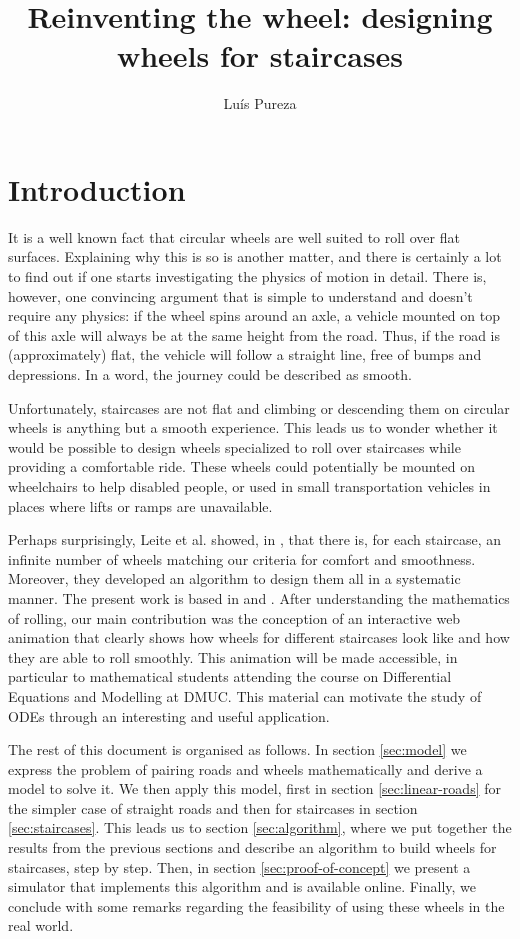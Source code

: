 \documentclass{article}
\theoremstyle{theorem}
\theoremstyle{theorem}
\begin{document}
\title{Reinventing the wheel: designing wheels for staircases} \date{}
\author{ Luís Pureza }
\maketitle

\section{Introduction}

It is a well known fact that circular wheels are well suited to roll
over flat surfaces. Explaining why this is so is another matter, and
there is certainly a lot to find out if one starts investigating the
physics of motion in detail. There is, however, one convincing
argument that is simple to understand and doesn't require any physics:
if the wheel spins around an axle, a vehicle mounted on top of this
axle will always be at the same height from the road. Thus, if the
road is (approximately) flat, the vehicle will follow a straight line,
free of bumps and depressions. In a word, the journey could be
described as smooth.

Unfortunately, staircases are not flat and climbing or descending them
on circular wheels is anything but a smooth experience. This leads us
to wonder whether it would be possible to design wheels specialized to
roll over staircases while providing a comfortable ride. These wheels
could potentially be mounted on wheelchairs to help disabled people,
or used in small transportation vehicles in places where lifts or
ramps are unavailable.

Perhaps surprisingly, Leite et al. showed, in \cite{leite}, that there
is, for each staircase, an infinite number of wheels matching our
criteria for comfort and smoothness. Moreover, they developed an
algorithm to design them all in a systematic manner. The present work
is based in \cite{hall-wagon} and \cite{leite}. After understanding
the mathematics of rolling, our main contribution was the conception
of an interactive web animation that clearly shows how wheels for
different staircases look like and how they are able to roll
smoothly. This animation will be made accessible, in particular to
mathematical students attending the course on Differential Equations
and Modelling at DMUC. This material can motivate the study of ODEs
through an interesting and useful application.

The rest of this document is organised as follows. In section
\ref{sec:model} we express the problem of pairing roads and wheels
mathematically and derive a model to solve it. We then apply this
model, first in section \ref{sec:linear-roads} for the simpler case of
straight roads and then for staircases in section
\ref{sec:staircases}. This leads us to section \ref{sec:algorithm},
where we put together the results from the previous sections and
describe an algorithm to build wheels for staircases, step by
step. Then, in section \ref{sec:proof-of-concept} we present a
simulator that implements this algorithm and is available
online. Finally, we conclude with some remarks regarding the
feasibility of using these wheels in the real world.
\end{document}
